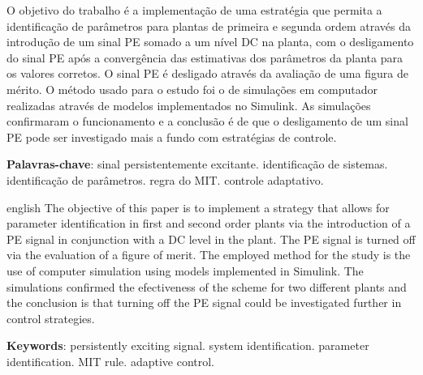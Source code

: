 \documentclass[
	12pt,				%
	openright,			%
	twoside,			%
	a4paper,			%
	english,			%
	french,				%
	spanish,			%
	brazil				%
	]{abntex2}
\begin{document}

\setlength{\absparsep}{18pt} %
\begin{resumo}
\thispagestyle{simple}
 
 O objetivo do trabalho é a implementação de uma estratégia que permita a identificação de parâmetros para plantas de primeira e segunda ordem através da introdução de um sinal PE somado a um nível DC na planta, com o desligamento do sinal PE após a convergência das estimativas dos parâmetros da planta para os valores corretos. O sinal PE é desligado através da avaliação de uma figura de mérito. O método usado para o estudo foi o de simulações em computador realizadas através de modelos implementados no Simulink. As simulações confirmaram o funcionamento e a conclusão é de que o desligamento de um sinal PE pode ser investigado mais a fundo com estratégias de controle.

 \textbf{Palavras-chave}: sinal persistentemente excitante. identificação de sistemas. identificação de parâmetros. regra do MIT. controle adaptativo.
\end{resumo}

\begin{resumo}[Abstract]
\thispagestyle{simple}
 \begin{otherlanguage*}{english}
   The objective of this paper is to implement a strategy that allows for parameter identification in first and second order plants via the introduction of a PE signal in conjunction with a DC level in the plant. The PE signal is turned off via the evaluation of a figure of merit. The employed method for the study is the use of computer simulation using models implemented in Simulink. The simulations confirmed the efectiveness of the scheme for two different plants and the conclusion is that turning off the PE signal could be investigated further in control strategies.

   \vspace{\onelineskip}
 
   \noindent 
   \textbf{Keywords}: persistently exciting signal. system identification. parameter identification. MIT rule. adaptive control.
 \end{otherlanguage*}
\end{resumo}

\listoffigures* %
\thispagestyle{simple}
\end{document}
